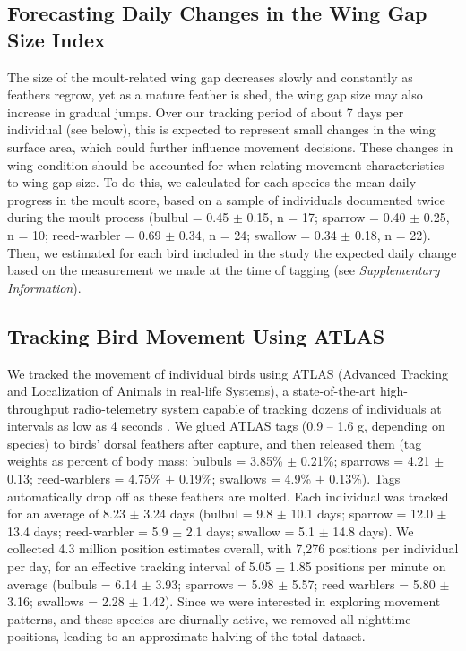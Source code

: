 \subsection*{Forecasting Daily Changes in the Wing Gap Size Index}

The size of the moult-related wing gap decreases slowly and constantly as feathers regrow, yet as a mature feather is shed, the wing gap size may also increase in gradual jumps.
Over our tracking period of about 7 days per individual (see below), this is expected to represent small changes in the wing surface area, which could further influence movement decisions.
These changes in wing condition should be accounted for when relating movement characteristics to wing gap size.
To do this, we calculated for each species the mean daily progress in the moult score, based on a sample of individuals documented twice during the moult process (bulbul = 0.45 $\pm$ 0.15, n = 17; sparrow = 0.40 $\pm$ 0.25, n = 10; reed-warbler = 0.69 $\pm$ 0.34, n = 24; swallow = 0.34 $\pm$ 0.18, n = 22). 
Then, we estimated for each bird included in the study the expected daily change based on the measurement we made at the time of tagging (see \textit{Supplementary Information}).

\subsection*{Tracking Bird Movement Using ATLAS}

We tracked the movement of individual birds using ATLAS (Advanced Tracking and Localization of Animals in real-life Systems), a state-of-the-art high-throughput radio-telemetry system capable of tracking dozens of individuals at intervals as low as 4 seconds \citep{weiser2016,toledo2014,toledo2020,nathan2022}.
We glued ATLAS tags (0.9 -- 1.6 g, depending on species) to birds' dorsal feathers after capture, and then released them (tag weights as percent of body mass: bulbuls = 3.85\% $\pm$ 0.21\%; sparrows = 4.21 $\pm$ 0.13; reed-warblers = 4.75\% $\pm$ 0.19\%; swallows = 4.9\% $\pm$ 0.13\%).
Tags automatically drop off as these feathers are molted.
Each individual was tracked for an average of 8.23 $\pm$ 3.24 days (bulbul = 9.8 $\pm$ 10.1 days; sparrow = 12.0 $\pm$ 13.4 days; reed-warbler = 5.9 $\pm$ 2.1 days; swallow = 5.1 $\pm$ 14.8 days).
We collected 4.3 million position estimates overall, with 7,276 positions per individual per day, for an effective tracking interval of 5.05 $\pm$ 1.85 positions per minute on average (bulbuls = 6.14 $\pm$ 3.93; sparrows = 5.98 $\pm$ 5.57; reed warblers = 5.80 $\pm$ 3.16; swallows = 2.28 $\pm$ 1.42).
Since we were interested in exploring movement patterns, and these species are diurnally active, we removed all nighttime positions, leading to an approximate halving of the total dataset.

